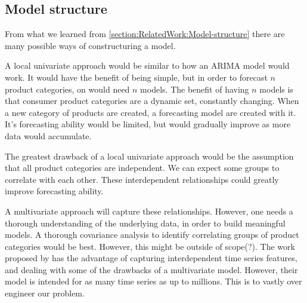 \subsection{Model structure}



From what we learned from \autoref{section:RelatedWork:Model-structure}
there are many possible ways of constructuring a model.

A local univariate approach would be similar to how an ARIMA model would work.
It would have the benefit of being simple, but in order to forecast $n$ product categories,
on would need $n$ models.
The benefit of having $n$ models is that consumer product categories are a dynamic set, constantly changing.
When a new category of products are created, a forecasting model are created with it. It's forecasting ability
would be limited, but would gradually improve as more data would accumulate.

The greatest drawback of a local univariate approach would be the assumption that all product categories
are independent. We can expect some groups to correlate with each other. These interdependent relationships
could greatly improve forecasting ability.

A multivariate approach will capture these relationships.
However, one needs a thorough understanding of the underlying data, in order to build meaningful models.
A thorough covariance analysis to identify correlating groups of product categories would be best.
However, this might be outside of scope(?).
The work proposed by \cite{Sen2019} has the advantage of capturing interdependent time series features, and dealing with
some of the drawbacks of a multivariate model. However, their model is intended for as many time series as up to millions.
This is to vastly over engineer our problem.

